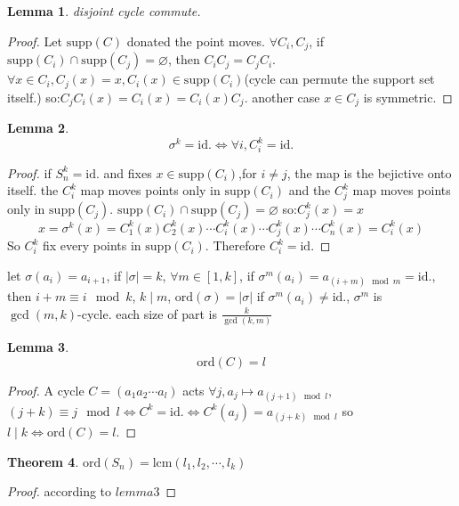 \documentclass[10pt,a4paper]{article}
\newtheorem{theorem}{Theorem}[section]
\newtheorem{lemma}[theorem]{Lemma}
\begin{document}
\begin{lemma}
    disjoint cycle commute.
\end{lemma}

\begin{proof}
    Let $\mathrm{supp}(C)$ donated the point moves. $\forall C_i,C_j$, if $\mathrm{supp}(C_i)\cap\mathrm{supp}(C_j)=\varnothing$, 
    then $C_iC_j=C_jC_i$. $\forall x\in C_i,C_j(x)=x,C_i(x)\in\mathrm{supp}(C_i)$(cycle can permute the support set itself.) 
    so:$C_jC_i(x)=C_i(x)=C_i(x)C_j$. another case $x\in C_j$ is symmetric.
\end{proof}
 
\begin{lemma}
    \[\sigma^k=\mathrm{id.}\iff\forall i,C_i^k=\mathrm{id.}\]
\end{lemma}

\begin{proof}
    if $S_{n}^{k}=\mathrm{id.}$ and fixes $x\in\mathrm{supp}(C_i)$,for $i\ne j$, the map is the bejictive onto itself.
    the $C_i^k$ map moves points only in $\mathrm{supp}(C_i)$ and the $C_j^k$ map moves points only in $\mathrm{supp}(C_j)$. $\mathrm{supp}(C_i)\cap\mathrm{supp}(C_j)=\varnothing$
    so:$C_j^k(x)=x$\[x=\sigma^k(x)=C_1^k(x)C_2^k(x)\cdots C_i^k(x)\cdots C_j^k(x)\cdots C_n^k(x)=C_i^k(x)\]
    So $C_i^k$ fix every points in $\mathrm{supp}(C_i)$. Therefore $C_i^k=\mathrm{id.}$
\end{proof}

let $\sigma(a_i)=a_{i+1}$, if $|\sigma|=k$, $\forall m\in[1,k]$, if $\sigma^m(a_i)=a_{(i+m)\mod m}=\mathrm{id.}$, then $i+m\equiv i\mod k$, $k\mid m$, $\mathrm{ord}(\sigma)=|\sigma|$
if $\sigma^m(a_i)\ne\mathrm{id.}$, $\sigma^m$ is $\gcd(m,k)$-cycle. each size of part is $\frac{k}{\gcd(k,m)}$

\begin{lemma}
    \[\mathrm{ord}(C)=l\]
\end{lemma}

\begin{proof}
    A cycle $C=(a_1a_2\cdots a_l)$ acts $\forall j,a_j\mapsto a_{(j+1)\mod l}$,$(j+k)\equiv j\mod l\iff C^k=\mathrm{id.}\iff C^k(a_j)=a_{(j+k)\mod l}$
    so $l\mid k\iff\mathrm{ord}(C)=l$.
\end{proof}

\begin{theorem}
    $\mathrm{ord}(S_n)=\mathrm{lcm}(l_1,l_2,\cdots,l_k)$
\end{theorem}

\begin{proof}
    according to $lemma3$
\end{proof} 
\end{document}
